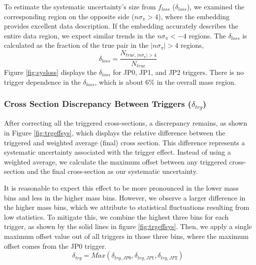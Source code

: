 To estimate the systematic uncertainty's size from $f_{loss}$ ($\delta_{loss}$), we examined the corresponding region on the opposite side ($n\sigma_\pi >4$), where the embedding provides excellent data description. If the embedding accurately describes the entire data region, we expect similar trends in the $n\sigma_\pi<-4$ regions. The $\delta_{loss}$ is calculated as the fraction of the true pair in the $|n\sigma_\pi| >4$ regions, 
\begin{equation}
    \delta_{loss} = \frac{N_{true,|n\sigma_\pi|>4}}{N_{true}}
\end{equation}
Figure \ref{fig:sysloss} displays the $\delta_{loss}$ for JP0, JP1, and JP2 triggers. There is no trigger dependence in the $\delta_{loss}$, which is about 6\% in the overall mass region.


\subsubsection{Cross Section Discrepancy Between Triggers ($\delta_{trg}$)}
After correcting all the triggered cross-sections, a discrepancy remains, as shown in Figure \ref{fig:trgeffsys}, which displays the relative difference between the triggered and weighted average (final) cross section. This difference represents a systematic uncertainty associated with the trigger effect. Instead of using a weighted average, we calculate the maximum offset between any triggered cross-section and the final cross-section as our systematic uncertainty.

It is reasonable to expect this effect to be more pronounced in the lower mass bins and less in the higher mass bins. However, we observe a larger difference in the higher mass bins, which we attribute to statistical fluctuations resulting from low statistics. To mitigate this, we combine the highest three bins for each trigger, as shown by the solid lines in figure \ref{fig:trgeffsys}. Then, we apply a single maximum offset value out of all triggers in those three bins, where the maximum offset comes from the JP0 trigger.
\begin{equation}
    \delta_{trg} = Max(\delta_{trg, JP0},\delta_{trg, JP1},\delta_{trg, JP2})
\end{equation}

